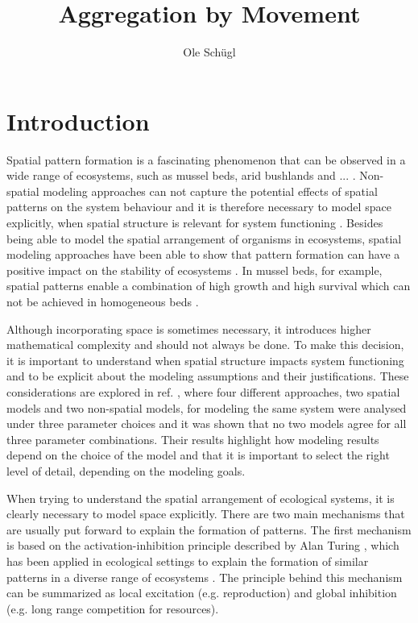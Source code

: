 \documentclass{article}
\title{Aggregation by Movement}
\author{Ole Schügl}
\begin{document}
\maketitle

\section{Introduction}
Spatial pattern formation is a fascinating phenomenon that can be observed in a wide range of ecosystems, such as mussel beds, arid bushlands and ... \autocite{liuPhaseSeparationDriven2016,rietkerkSelfOrganizationVegetationArid}.
Non-spatial modeling approaches can not capture the potential effects of spatial patterns on the system behaviour and it is therefore necessary to model space explicitly, when spatial structure is relevant for system functioning \cite{durrettImportanceBeingDiscrete1994}.
Besides being able to model the spatial arrangement of organisms in ecosystems, spatial modeling approaches have been able to show that pattern formation can have a positive impact on the stability of ecosystems \cite{durrettImportanceBeingDiscrete1994, vandekoppelExperimentalEvidenceSpatial2008,rietkerkEvasionTippingComplex2021,liuPatternFormationMultiple2014}. 
In mussel beds, for example, spatial patterns enable a combination of high growth and high survival which can not be achieved in homogeneous beds \autocite{vandekoppelExperimentalEvidenceSpatial2008}.

Although incorporating space is sometimes necessary, it introduces higher mathematical complexity and should not always be done.
To make this decision, it is important to understand when spatial structure impacts system functioning and to be explicit about the modeling assumptions and their justifications.
These considerations are explored in ref. \cite{durrettImportanceBeingDiscrete1994}, where four different approaches, two spatial models and two non-spatial models, for modeling the same system were analysed under three parameter choices and it was shown that no two models agree for all three parameter combinations.
Their results highlight how modeling results depend on the choice of the model and that it is important to select the right level of detail, depending on the modeling goals.

When trying to understand the spatial arrangement of ecological systems, it is clearly necessary to model space explicitly.
There are two main mechanisms that are usually put forward to explain the formation of patterns.
The first mechanism is based on the activation-inhibition principle described by Alan Turing \autocite{turingChemicalBasisMorphogenesis1952}, which has been applied in ecological settings to explain the formation of similar patterns in a diverse range of ecosystems \autocite{rietkerkRegularPatternFormation2008}.
The principle behind this mechanism can be summarized as local excitation (e.g. reproduction) and global inhibition (e.g. long range competition for resources).
\end{document}
